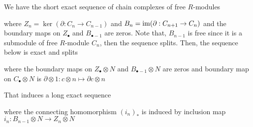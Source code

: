 \documentclass{article}
\begin{document}
\begin{longproof}
    We have the short exact sequence of chain complexes of free $R$-modules
    \begin{center}
    \end{center}

    where $Z_n = \ker(\partial: C_n \to C_{n-1})$ and $B_n = \operatorname{im} (\partial: C_{n+1} \to C_n)$ and the boundary maps on $Z_\bullet$ and $B_{\bullet-1}$ are zeros. Note that, $B_{n-1}$ is free since it is a submodule of free $R$-module $C_n$, then the sequence splits. Then, the sequence below is exact and splits

    \begin{center}
    \end{center}

    where the boundary maps on $Z_\bullet \otimes N$ and $B_{\bullet-1} \otimes N$ are zeros and boundary map on $C_\bullet \otimes N$ is $\partial \otimes 1: c \otimes n \mapsto \partial c \otimes n$

    That induces a long exact sequence

    \begin{center}
    \end{center}

    where the connecting homomorphism $(i_n)_*$ is induced by inclusion map $i_n: B_{n-1} \otimes N \to Z_n \otimes N$


\end{longproof}
\end{document}

